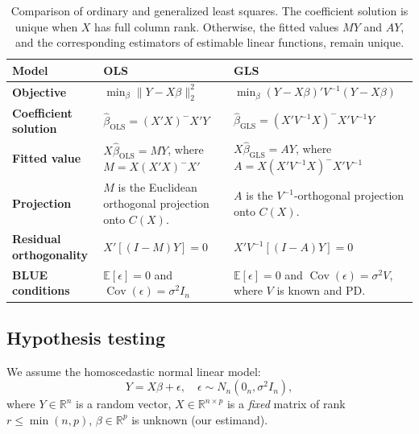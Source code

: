 \documentclass{article}
\theoremstyle{break}
\newcommand{\R}{\ensuremath{\mathbb{R}}}
\newcommand{\E}{\ensuremath{\mathbb{E}}}
\DeclareMathOperator{\Cov}{Cov}
\begin{document}
\begin{table}[!h]
\centering
\small
\renewcommand{\arraystretch}{1.5}
\begin{tabularx}{\textwidth}{
    >{\raggedright\arraybackslash}p{}
    >{\raggedright\arraybackslash}p{}
    >{\raggedright\arraybackslash}X
}
\hline
\textbf{Model}
&
\centering\arraybackslash\textbf{OLS}
&
\centering\arraybackslash\textbf{GLS}
\\
\hline

\textbf{Objective}
&
$\displaystyle \min_\beta\|Y-X\beta\|_2^2$
&
$\displaystyle \min_\beta (Y-X\beta)'V^{-1}(Y-X\beta)$
\\

\textbf{Coefficient solution}
&
$\displaystyle \hat\beta_{\mathrm{OLS}}=(X'X)^-X'Y$
&
$\displaystyle \hat\beta_{\mathrm{GLS}}
=(X'V^{-1}X)^-X'V^{-1}Y$
\\

\textbf{Fitted value}
&
$\displaystyle X\hat\beta_{\mathrm{OLS}}=MY$, where
$\displaystyle M=X(X'X)^-X'$
&
$\displaystyle X\hat\beta_{\mathrm{GLS}}=AY$, where
$\displaystyle A=X(X'V^{-1}X)^-X'V^{-1}$
\\

\textbf{Projection}
&
$M$ is the Euclidean orthogonal projection onto $C(X)$.
&
$A$ is the $V^{-1}$-orthogonal projection onto $C(X)$.
\\

\textbf{Residual orthogonality}
&
$\displaystyle X'[(I-M)Y]=0$
&
$\displaystyle X'V^{-1}[(I-A)Y]=0$
\\

\textbf{BLUE conditions}
&
$\displaystyle \E[\epsilon]=0$ and
$\displaystyle \Cov(\epsilon)=\sigma^2I_n$
&
$\displaystyle \E[\epsilon]=0$ and
$\displaystyle \Cov(\epsilon)=\sigma^2V$, where $V$ is known and PD.
\\
\hline
\end{tabularx}
\caption{Comparison of ordinary and generalized least squares. The coefficient solution is unique when $X$ has full column rank. Otherwise, the fitted values $MY$ and $AY$, and the corresponding estimators of estimable linear functions, remain unique.}
\label{tab:ols-gls-comparison}
\end{table}



\subsection{Hypothesis testing}\label{sec:lm-testing}
We assume the homoscedastic normal linear model:
\[
    Y = X\beta + \epsilon,
    \quad
    \epsilon \sim N_n(0_n, \sigma^2 I_n),
\]
where $Y\in \R^n$ is a random vector, $X \in \R^{n \times p}$ is a \emph{fixed} matrix of rank $r \leq \min(n,p)$, $\beta \in \R^p$ is unknown (our estimand).
\end{document}
